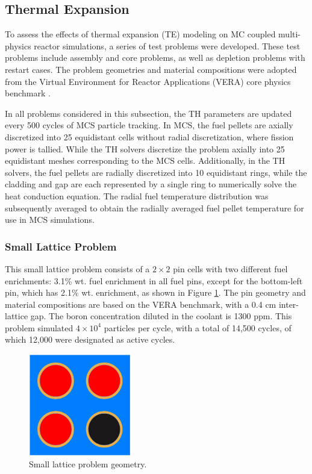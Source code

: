 \subsection{Thermal Expansion} \label{sec42}

To assess the effects of thermal expansion (TE) modeling on MC coupled multi-physics reactor simulations, a series of test problems were developed. These test problems include assembly and core problems, as well as depletion problems with restart cases. The problem geometries and material compositions were adopted from the Virtual Environment for Reactor Applications (VERA) core physics benchmark \cite{godfrey}.

In all problems considered in this subsection, the TH parameters are updated every 500 cycles of MCS particle tracking. In MCS, the fuel pellets are axially discretized into 25 equidistant cells without radial discretization, where fission power is tallied. While the TH solvers discretize the problem axially into 25 equidistant meshes corresponding to the MCS cells. Additionally, in the TH solvers, the fuel pellets are radially discretized into 10 equidistant rings, while the cladding and gap are each represented by a single ring to numerically solve the heat conduction equation. The radial fuel temperature distribution was subsequently averaged to obtain the radially averaged fuel pellet temperature for use in MCS simulations.


\subsubsection{Small Lattice Problem}

This small lattice problem consists of a $2\times2$ pin cells with two different fuel enrichments: 3.1\% wt. fuel enrichment in all fuel pins, except for the bottom-left pin, which has 2.1\% wt. enrichment, as shown in Figure \ref{fig_42a}. The pin geometry and material compositions are based on the VERA benchmark, with a 0.4 cm inter-lattice gap. The boron concentration diluted in the coolant is 1300 ppm. This problem simulated $4\times10^4$ particles per cycle, with a total of 14,500 cycles, of which 12,000 were designated as active cycles.

\begin{figure}[h]
    \centering
    \includegraphics[width=0.4\textwidth]{figs/xy_plot_noGrid.pdf}
    \caption{Small lattice problem geometry.}
    \label{fig_42a}
\end{figure}

